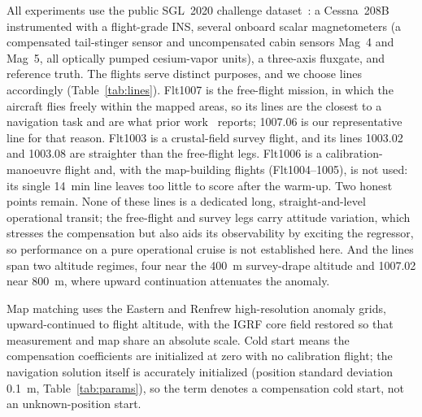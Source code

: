 \documentclass{IEEEtaes}
\begin{document}
All experiments use the public SGL~2020 challenge dataset~\cite{gnadt2020}: a
Cessna~208B instrumented with a flight-grade INS, several onboard scalar
magnetometers (a compensated tail-stinger sensor and uncompensated cabin sensors
Mag~4 and Mag~5, all optically pumped cesium-vapor units), a three-axis
fluxgate, and reference truth. The flights serve distinct purposes, and we
choose lines accordingly (Table~\ref{tab:lines}). Flt1007 is the free-flight
mission, in which the aircraft flies freely within the mapped areas, so its
lines are the closest to a navigation task and are what prior
work~\cite{gnadt2020,canciani2017,hager2026} reports; 1007.06 is our
representative line for that reason. Flt1003 is a crustal-field survey flight,
and its lines 1003.02 and 1003.08 are straighter than the free-flight legs.
Flt1006 is a calibration-manoeuvre flight and, with the map-building flights
(Flt1004--1005), is not used: its single \SI{14}{\minute} line leaves too little
to score after the warm-up.
Two honest points remain. None of these lines is a dedicated long,
straight-and-level operational transit; the free-flight and survey legs carry
attitude variation, which stresses the compensation but also aids its
observability by exciting the regressor, so performance on a pure operational
cruise is not established here. And the lines span two altitude regimes, four
near the \SI{400}{\meter} survey-drape altitude and 1007.02 near
\SI{800}{\meter}, where upward continuation attenuates the anomaly.

Map matching uses the Eastern and Renfrew high-resolution anomaly grids,
upward-continued to flight altitude, with the IGRF core field restored so that
measurement and map share an absolute scale. Cold start means the compensation
coefficients are initialized at zero with no calibration flight; the navigation
solution itself is accurately initialized (position standard deviation
\SI{0.1}{\meter}, Table~\ref{tab:params}), so the term denotes a compensation
cold start, not an unknown-position start.
\end{document}
